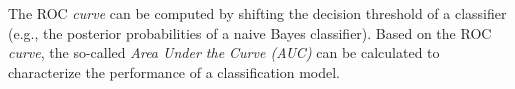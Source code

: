 \documentclass{article}
\begin{document}
\noindent The ROC \emph{curve} can be computed by shifting the decision threshold of a classifier (e.g., the posterior probabilities of a naive Bayes classifier). Based on the  ROC \emph{curve}, the so-called \emph{Area Under the Curve (AUC)} can be calculated to characterize the performance of a classification model.



{}

\end{document}

